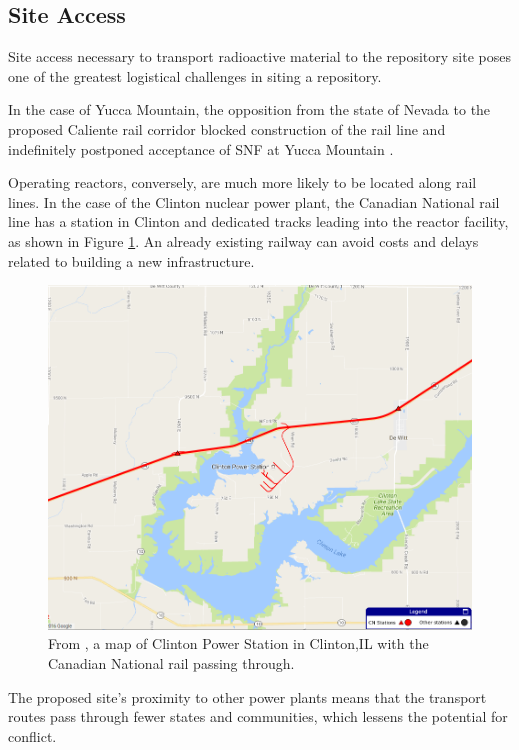 \subsection{Site Access}

Site access necessary to transport radioactive material to the repository site 
poses one of the greatest logistical challenges in siting a repository. 

In the case of Yucca Mountain, 
the opposition from the state of Nevada to the proposed Caliente rail corridor 
blocked construction of the rail line and indefinitely postponed
acceptance of \gls{SNF} at Yucca Mountain \cite{halstead_yucca_2011}.

Operating reactors, conversely, are much more likely to be located along rail 
lines. In the case of the Clinton nuclear power plant, 
the Canadian National rail line \cite{waleed_regional_2015} has a station in 
Clinton and dedicated tracks leading into the reactor facility, as shown in 
Figure \ref{fig:cnmap}. An already existing railway can avoid costs and delays related
 to building a new infrastructure.

\begin{figure}[!h] 
  \centering
  \includegraphics[width=0.8\columnwidth]{cnmap.png}	
        \caption{From \cite{canadian_national_railway_company_canadian_2016}, a map of Clinton Power Station in Clinton,IL
        with the Canadian National rail passing through.}
  \label{fig:cnmap}
\end{figure}

The proposed site's proximity to other power plants means that the transport
routes pass through fewer states and communities, which lessens the potential 
for conflict.

